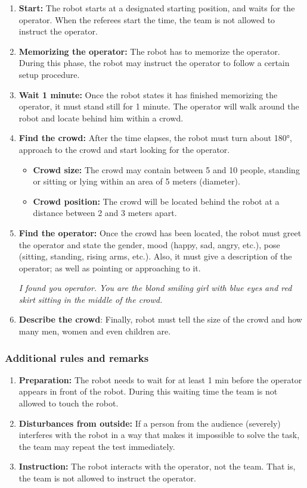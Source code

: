 \begin{enumerate}

\item \textbf{Start:} The robot starts at a designated starting position, and waits for the  operator. When the referees start the time, the team is not allowed to instruct the operator.
\item \textbf{Memorizing the operator:} The robot has to memorize the operator. During this phase, the robot may instruct the operator to follow a certain setup procedure.
\item \textbf{Wait 1 minute:} Once the robot states it has finished memorizing the operator, it must stand still for 1 minute. The operator will walk around the robot and locate behind him within a crowd.
\item \textbf{Find the crowd:} After the time elapses, the robot must turn about 180°, approach to the crowd and start looking for the operator.
\begin{itemize}
\item \textbf{Crowd size:} The crowd may contain between 5 and 10 people, standing or sitting or lying within an  area of 5 meters (diameter).
\item \textbf{Crowd position:} The crowd will be located behind the robot at a distance between 2 and 3 meters apart.
\end{itemize}
\item \textbf{Find the operator:} Once the crowd has been located, the robot must greet the operator and state the gender, mood (happy, sad, angry, etc.), pose (sitting, standing, rising arms, etc.). Also, it must give a description of the operator; as well as pointing or approaching to it.

\textit{I found you operator. You are the blond smiling girl with blue eyes and red skirt sitting in the middle of the crowd.}

\item \textbf{Describe the crowd}: Finally, robot must tell the size of the crowd and how many men, women and even children are.
\end{enumerate}

\subsubsection{Additional rules and remarks}
\begin{enumerate}
\item \textbf{Preparation:} The robot needs to wait for at least 1 min before the operator appears in front of the robot. During this waiting time the team is not allowed to touch the robot.
\item \textbf{Disturbances from outside:} If a person from the audience (severely) interferes with the robot in a way that makes it impossible to solve the task, the team may repeat the test immediately.
\item \textbf{Instruction:} The robot interacts with the operator, not the team. That is, the team is not allowed to instruct the operator.
\end{enumerate}


